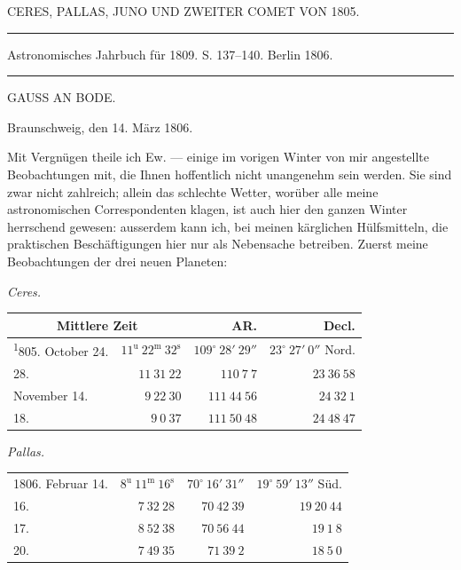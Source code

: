 \clearpage
{}
\begin{center}
CERES, PALLAS, JUNO UND ZWEITER COMET VON 1805.
\end{center}

\noindent\rule{\linewidth}{0.4pt}
\begin{center}
Astronomisches Jahrbuch für 1809. S. 137–140. Berlin 1806.
\end{center}
\noindent\rule{\linewidth}{0.4pt}

\begin{center}
GAUSS AN BODE.
\end{center}
\hfill Braunschweig, den 14. März 1806.

\par\indent Mit Vergnügen theile ich Ew. --- einige im vorigen Winter von mir angestellte Beobachtungen mit, die Ihnen hoffentlich nicht unangenehm sein werden. Sie sind zwar nicht zahlreich; allein das schlechte Wetter, worüber alle meine astronomischen Correspondenten klagen, ist auch hier den ganzen Winter herrschend gewesen: ausserdem kann ich, bei meinen kärglichen Hülfsmitteln, die praktischen Beschäftigungen hier nur als Nebensache betreiben. Zuerst meine Beobachtungen der drei neuen Planeten:

\begin{center}\emph{Ceres.}\end{center}
\begin{center}
\begingroup\fontsize{9}{11}\selectfont\setlength{\tabcolsep}{2pt}\renewcommand{\arraystretch}{1.1}
\begin{tabular}{lr|r|r}
\multicolumn{2}{c|}{Mittlere Zeit} & AR. & Decl.\\ \hline
\textsuperscript{1}805. October 24. & $11^{\mathrm u}\ 22^{\mathrm m}\ 32^{\mathrm s}$ & $109^\circ\ 28'\ 29''$ & $23^\circ\ 27'\ 0''$ Nord.\\
28. & $11\ 31\ 22$ & $110\ 7\ 7$ & $23\ 36\ 58$\\
November 14. & $9\ 22\ 30$ & $111\ 44\ 56$ & $24\ 32\ 1$\\
18. & $9\ 0\ 37$ & $111\ 50\ 48$ & $24\ 48\ 47$\\
\end{tabular}\endgroup
\end{center}

\begin{center}\emph{Pallas.}\end{center}
\begin{center}
\begingroup\fontsize{9}{11}\selectfont\setlength{\tabcolsep}{2pt}\renewcommand{\arraystretch}{1.1}
\begin{tabular}{lr|r|r}
1806. Februar 14. & $8^{\mathrm u}\ 11^{\mathrm m}\ 16^{\mathrm s}$ & $70^\circ\ 16'\ 31''$ & $19^\circ\ 59'\ 13''$ Süd.\\
16. & $7\ 32\ 28$ & $70\ 42\ 39$ & $19\ 20\ 44$\\
17. & $8\ 52\ 38$ & $70\ 56\ 44$ & $19\ 1\ 8$\\
20. & $7\ 49\ 35$ & $71\ 39\ 2$ & $18\ 5\ 0$\\
\end{tabular}\endgroup
\end{center}

